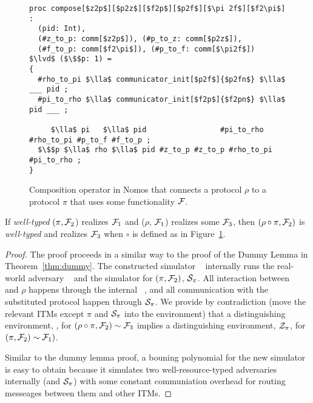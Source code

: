 \begin{figure*}
\begin{lstlisting}[basicstyle=\small\BeraMonottFamily, frame=single,  mathescape]
proc compose[$z2p$][$p2z$][$f2p$][$p2f$][$\pi 2f$][$f2\pi$] :
  (pid: Int), 
  (#z_to_p: comm[$z2p$]), (#p_to_z: comm[$p2z$]),
  (#f_to_p: comm[$f2\pi$]), (#p_to_f: comm[$\pi2f$])  $\lvd$ ($\$$p: 1) =
{
  #rho_to_pi $\lla$ communicator_init[$p2f$]{$p2fn$} $\lla$  ___ pid ;
  #pi_to_rho $\lla$ communicator_init[$f2p$]{$f2pn$} $\lla$ pid ___ ;
  
     $\lla$ pi   $\lla$ pid                 #pi_to_rho #rho_to_pi #p_to_f #f_to_p ;
  $\$$p $\lla$ rho $\lla$ pid #z_to_p #z_to_p #rho_to_pi #pi_to_rho ;
}

\end{lstlisting}
\caption{Composition operator in Nomos that connects a protocol $\rho$ to a protocol $\pi$ that uses some functionality $\mathcal{F}$.}
\label{lst:compose} 
\end{figure*}


\begin{theorem}[Composition]\label{thm:composition}
If \textit{well-typed} $(\pi, \mathcal{F}_2$) realizes $\mathcal{F}_1$ and ($\rho$, $\mathcal{F}_1$) realizes some $\mathcal{F}_3$, then $(\rho \circ \pi, \mathcal{F}_2)$ is \textit{well-typed} and realizes $\mathcal{F}_3$ when $\circ$ is defined as in Figure~\ref{lst:compose}.
\end{theorem}

\begin{proof}
The proof proceeds in a similar way to the proof of the Dummy Lemma in Theorem~\ref{thm:dummy}. 
The constructed simulator \Simulator~ internally runs the real-world adversary \Adversary~ and the simulator for $(\pi, \mathcal{F}_2)$, $\mathcal{S}_\pi$. 
All interaction between \Environment~ and $\rho$ happens through the internal \Adversary~, and all communication with the substituted protocol happen through $\mathcal{S}_\pi$. 
We provide by contradiction (move the relevant ITMs except $\pi$ and $\mathcal{S}_\pi$ into the environment) that a distinguishing environment, \Environment, for $(\rho \circ \pi, \mathcal{F}_2) \sim \mathcal{F}_3$ implies a distinguishing environment, $\mathcal{Z}_\pi$, for $(\pi, \mathcal{F}_2) \sim \mathcal{F}_1)$. 

Similar to the dummy lemma proof, a bouning polynomial for the new simulator \Simulator is easy to obtain because it simulates two well-resource-typed adversaries internally (\Adversary and $\mathcal{S}_\pi$) with some constant communiation overhead for routing messeages between them and other ITMs. 
\end{proof}

